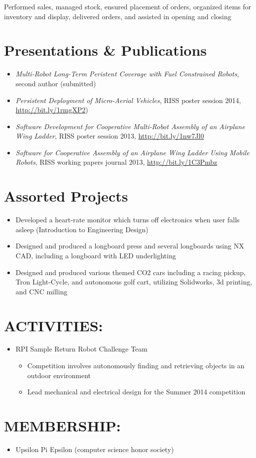 \begin{resume}
  {
   	\item Performed sales, managed stock, ensured placement of orders, organized items for
					inventory and display, delivered orders, and assisted in opening and closing
  }
\normalsize{\section{Presentations \& Publications}}
\begin{itemize}
  \item \emph{Multi-Robot Long-Term Peristent Coverage with Fuel Constrained
    Robots}, second author (submitted)
  \item \emph{Persistent Deployment of Micro-Aerial Vehicles}, RISS poster
    session 2014, \url{http://bit.ly/1rmgXP2})
  \item \emph{Software Development for Cooperative Multi-Robot Assembly of an
    Airplane Wing Ladder}, RISS poster session 2013, \url{http://bit.ly/1nw7Jl0}
  \item \emph{Software for Cooperative Assembly of an Airplane Wing Ladder Using
    Mobile Robots}, RISS working papers journal 2013, \url{http://bit.ly/1C3Pmbz}
\end{itemize}

\normalsize{\section{Assorted Projects}}
\begin{itemize}
  \item Developed a heart-rate monitor which turns off electronics when user
    falls asleep (Introduction to Engineering Design)
  \item Designed and produced a longboard press and several longboards using NX CAD, including a longboard
        with LED underlighting
  \item Designed and produced various themed CO2 cars including a racing pickup, Tron Light-Cycle,
        and autonomous golf cart, utilizing Solidworks, 3d printing, and CNC milling
\end{itemize}
\section{ACTIVITIES:}
	\begin{itemize}
    \item RPI Sample Return Robot Challenge Team
    \begin{itemize}
      \item Competition involves autonomously finding and retrieving objects in an outdoor environment
      \item Lead mechanical and electrical design for the Summer 2014 competition
    \end{itemize}
	\end{itemize}
\section{MEMBERSHIP:}
	\begin{itemize}
    \item Upsilon Pi Epsilon (computer science honor society)
	\end{itemize}
\end{resume} 

